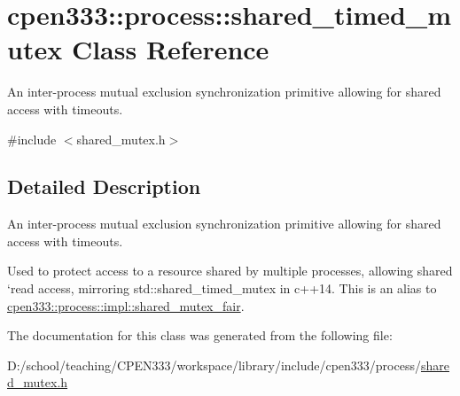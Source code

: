 \hypertarget{classcpen333_1_1process_1_1shared__timed__mutex}{}\section{cpen333\+:\+:process\+:\+:shared\+\_\+timed\+\_\+mutex Class Reference}
\label{classcpen333_1_1process_1_1shared__timed__mutex}


An inter-\/process mutual exclusion synchronization primitive allowing for shared access with timeouts.  




{\ttfamily \#include $<$shared\+\_\+mutex.\+h$>$}



\subsection{Detailed Description}
An inter-\/process mutual exclusion synchronization primitive allowing for shared access with timeouts. 

Used to protect access to a resource shared by multiple processes, allowing shared `read\textquotesingle{} access, mirroring std\+::shared\+\_\+timed\+\_\+mutex in c++14. This is an alias to \hyperlink{classcpen333_1_1process_1_1impl_1_1shared__mutex__fair}{cpen333\+::process\+::impl\+::shared\+\_\+mutex\+\_\+fair}. 

The documentation for this class was generated from the following file\+:\begin{DoxyCompactItemize}
\item 
D\+:/school/teaching/\+C\+P\+E\+N333/workspace/library/include/cpen333/process/\hyperlink{process_2shared__mutex_8h}{shared\+\_\+mutex.\+h}\end{DoxyCompactItemize}
